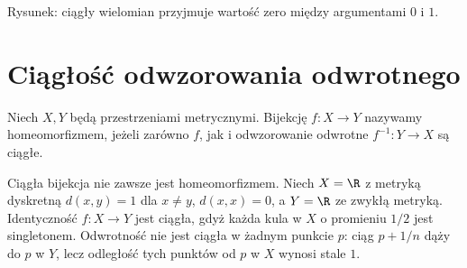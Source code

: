 \begin{center}

\small Rysunek: ciągły wielomian przyjmuje wartość zero między argumentami $0$ i $1$.
\end{center}

\section{Ciągłość odwzorowania odwrotnego}
\begin{definicja}
\label{ma1:def:homeomorphism}
Niech $X,Y$ będą przestrzeniami metrycznymi. Bijekcję $f:X\to Y$ nazywamy homeomorfizmem, jeżeli zarówno $f$, jak i odwzorowanie odwrotne $f^{-1}:Y\to X$ są ciągłe.
\end{definicja}
Ciągła bijekcja nie zawsze jest homeomorfizmem. Niech $X=\R$ z metryką dyskretną $d(x,y)=1$ dla $x\ne y$, $d(x,x)=0$, a $Y=\R$ ze zwykłą metryką. Identyczność $f:X\to Y$ jest ciągła, gdyż każda kula w $X$ o promieniu $1/2$ jest singletonem. Odwrotność nie jest ciągła w żadnym punkcie $p$: ciąg $p+1/n$ dąży do $p$ w $Y$, lecz odległość tych punktów od $p$ w $X$ wynosi stale $1$.

